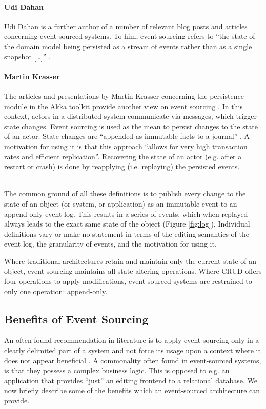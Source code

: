 \paragraph{Udi Dahan}{
Udi Dahan is a further author of a number of relevant blog posts and articles 
concerning event-sourced systems. To him, event sourcing refers to ``the state 
of the domain model being persisted as a stream of events rather than as a 
single snapshot [\dots]'' \cite{Betts2013}.
}

\paragraph{Martin Krasser}{
The articles and presentations by Martin Krasser concerning the persistence 
module in the Akka toolkit provide another view on event sourcing 
\mbox{\cite{Krasser2013, Krasser2015}.}
In this context, actors in a distributed system communicate via messages, 
which trigger state changes. Event sourcing is used as the mean to persist 
changes to the state of an actor.
State changes are ``appended as immutable facts to a journal'' \cite{Krasser2013}. 
A motivation for using it is that this approach ``allows for very high 
transaction rates and efficient replication''.
Recovering the state of an actor (e.g. after a restart or crash) is done by 
reapplying (i.e. replaying) the persisted events.
}


\ \\
The common ground of all these definitions is to publish every change to the 
state of an object (or system, or application) as an immutable event to an 
append-only event log. 
This results in a series of events, which when replayed always leads to the 
exact same state of the object (Figure \ref{fig:log}). Individual definitions 
vary or make no statement in terms of the editing semantics of the event log, 
the granularity of events, and the motivation for using it.

Where traditional architectures retain and maintain only the current state
of an object, event sourcing maintains all state-altering operations. Where 
CRUD offers four operations to apply modifications, event-sourced systems 
are restrained to only one operation: append-only.

\subsection{Benefits of Event Sourcing}
\label{sec:es-cs-benefits} 
An often found recommendation in literature is to apply event sourcing only in 
a clearly delimited part of a system and not force its usage upon a context 
where it does not appear beneficial \cite{Betts2013}.
A commonality often found in event-sourced systems, is that they possess a 
complex business logic. This is opposed to e.g. an application that provides 
``just'' an editing frontend to a relational database. We now briefly describe 
some of the benefits which an event-sourced architecture can provide.

